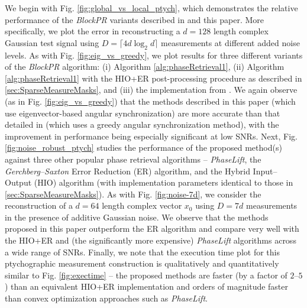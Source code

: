 We begin with Fig. \ref{fig:global_vs_local_ptych}, which demonstrates the relative performance of the {\em BlockPR} variants described in \cite{IVW2015_FastPhase} and this paper. More specifically, we plot the error in reconstructing a $d=128$ length complex Gaussian test signal using $D = \lceil 4d\log_2 d\rceil$ measurements at different added noise levels. As with Fig. \ref{fig:eig_vs_greedy}, we plot results for three different variants of the {\em BlockPR} algorithm: (i) Algorithm \ref{alg:phaseRetrieval1}, (ii) Algorithm \ref{alg:phaseRetrieval1} with the HIO+ER post-processing procedure as described in \cref{sec:SparseMeasureMasks}, and (iii) the implementation from \cite{IVW2015_FastPhase}. We again observe (as in Fig. \ref{fig:eig_vs_greedy}) that the methods described in this paper (which use eigenvector-based angular synchronization) are more accurate than that detailed in \cite{IVW2015_FastPhase} (which uses a greedy angular synchronization method), with the improvement in performance being especially significant at low SNRs. Next, Fig. \ref{fig:noise_robust_ptych} studies the performance of the proposed method(s) against three other popular phase retrieval algorithms -- {\em PhaseLift}, the {\em Gerchberg--Saxton} Error Reduction (ER) algorithm, and the Hybrid Input--Output (HIO) algorithm (with implementation parameters identical to those in \cref{sec:SparseMeasureMasks}). As with Fig. \ref{fig:noise-7d}, we consider the reconstruction of a $d = 64$ length complex vector $x_0$ using $D = 7d$ measurements in the presence of additive Gaussian noise. We observe that the methods proposed in this paper outperform the ER algorithm and compare very well with the HIO+ER and (the significantly more expensive) {\em PhaseLift} algorithms across a wide range of SNRs. 
Finally, we note that the execution time plot for this ptychographic measurement construction is qualitatively and quantitatively similar to Fig. \ref{fig:exectime} -- the proposed methods are faster (by a factor of $2$--$5$) than an equivalent HIO+ER implementation and orders of magnitude faster than convex optimization approaches such as {\em PhaseLift}. 

